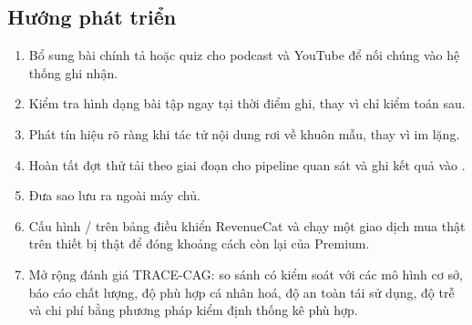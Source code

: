 \subsection{Hướng phát triển}

\begin{enumerate}[leftmargin=1.4em]
  \item Bổ sung bài chính tả hoặc quiz cho podcast và YouTube để nối chúng vào hệ thống
  ghi nhận.
  \item Kiểm tra hình dạng bài tập ngay tại thời điểm ghi, thay vì chỉ kiểm toán sau.
  \item Phát tín hiệu rõ ràng khi tác tử nội dung rơi về khuôn mẫu, thay vì im lặng.
  \item Hoàn tất đợt thử tải theo giai đoạn cho pipeline quan sát và ghi kết quả vào
  .
  \item Đưa sao lưu ra ngoài máy chủ.
  \item Cấu hình / trên bảng điều khiển
  RevenueCat và chạy một giao dịch mua thật trên thiết bị thật để đóng khoảng cách còn lại
  của Premium.
  \item Mở rộng đánh giá TRACE-CAG: so sánh có kiểm soát với các mô hình cơ sở, báo cáo
  chất lượng, độ phù hợp cá nhân hoá, độ an toàn tái sử dụng, độ trễ và chi phí bằng
  phương pháp kiểm định thống kê phù hợp.
\end{enumerate}
